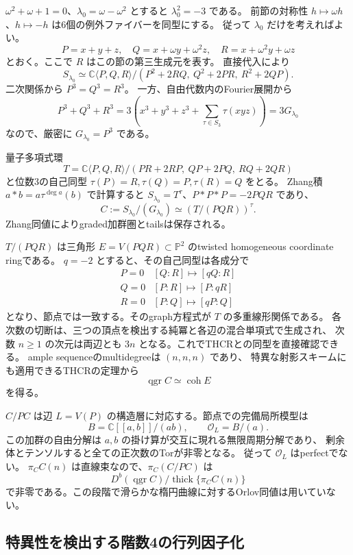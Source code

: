\documentclass[a4paper,11pt]{ltjsarticle}
\theoremstyle{definition}
\newcommand{\CC}{\mathbb C}
\newcommand{\OO}{\mathcal O}
\newcommand{\PP}{\mathbb P}
\newcommand{\qgr}{\operatorname{qgr}}
\begin{document}
$\omega^2+\omega+1=0$、$\lambda_0=\omega-\omega^2$ とすると $\lambda_0^2=-3$ である。
前節の対称性 $h\mapsto\omega h$、$h\mapsto-h$ は6個の例外ファイバーを同型にする。
従って $\lambda_0$ だけを考えればよい。
\[
 P=x+y+z,\quad Q=x+\omega y+\omega^2z,\quad R=x+\omega^2y+\omega z
\]
とおく。ここで $R$ はこの節の第三生成元を表す。
直接代入により
\[
 S_{\lambda_0}\simeq
 \CC\langle P,Q,R\rangle/(P^2+2RQ,\ Q^2+2PR,\ R^2+2QP).
\]
二次関係から $P^3=Q^3=R^3$。
一方、自由代数内のFourier展開から
\[
 P^3+Q^3+R^3
 =3\left(x^3+y^3+z^3+\sum_{\tau\in S_3}\tau(xyz)\right)
 =3G_{\lambda_0}
\]
なので、厳密に $G_{\lambda_0}=P^3$ である。

量子多項式環
\[
 T=\CC\langle P,Q,R\rangle/(PR+2RP,\ QP+2PQ,\ RQ+2QR)
\]
と位数3の自己同型 $\tau(P)=R,\tau(Q)=P,\tau(R)=Q$ をとる。
Zhang積 $a*b=a\tau^{\deg a}(b)$ で計算すると
$S_{\lambda_0}=T^\tau$、$P*P*P=-2PQR$ であり、
\[
 C:=S_{\lambda_0}/(G_{\lambda_0})\simeq(T/(PQR))^\tau.
\]
Zhang同値\cite[Theorem 1.1]{Zhang}によりgraded加群圏とtailsは保存される。

$T/(PQR)$ は三角形 $E=V(PQR)\subset\PP^2$ のtwisted homogeneous coordinate ringである。
$q=-2$ とすると、その自己同型は各成分で
\[
 \begin{array}{c|c}
 P=0 &[Q:R]\mapsto[qQ:R]\\
 Q=0 &[P:R]\mapsto[P:qR]\\
 R=0 &[P:Q]\mapsto[qP:Q]
 \end{array}
\]
となり、節点では一致する。そのgraph方程式が $T$ の多重線形関係である。
各次数の切断は、三つの頂点を検出する純冪と各辺の混合単項式で生成され、
次数 $n\ge1$ の次元は両辺とも $3n$ となる。これでTHCRとの同型を直接確認できる。
ample sequenceのmultidegreeは $(n,n,n)$ であり、
特異な射影スキームにも適用できるTHCRの定理\cite{AV,SVdB}から
\[
 \qgr C\simeq\operatorname{coh}E
\]
を得る。

$C/PC$ は辺 $L=V(P)$ の構造層に対応する。節点での完備局所模型は
\[
 B=\CC[[a,b]]/(ab),\qquad \OO_L=B/(a).
\]
この加群の自由分解は $a,b$ の掛け算が交互に現れる無限周期分解であり、
剰余体とテンソルすると全ての正次数のTorが非零となる。
従って $\OO_L$ はperfectでない。
$\pi_C C(n)$ は直線束なので、$\pi_C(C/PC)$ は
\[
 D^b(\qgr C)/\operatorname{thick}\{\pi_C C(n)\}
\]
で非零である。この段階で滑らかな楕円曲線に対するOrlov同値は用いていない。

\subsection{特異性を検出する階数4の行列因子化}
\end{document}
